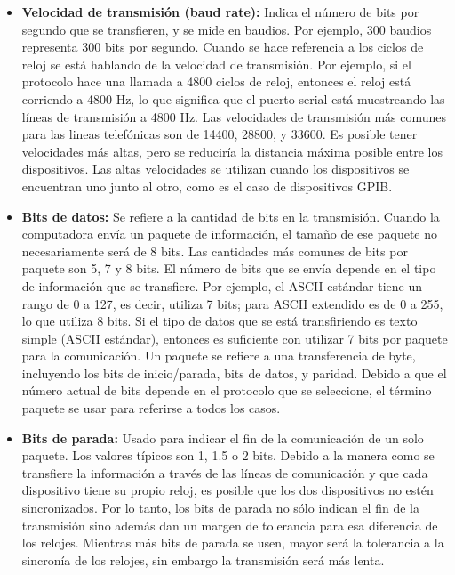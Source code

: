 \begin{itemize}
  \item \textbf{Velocidad de transmisión (baud rate):} Indica el número de bits por segundo que se transfieren, y se mide en baudios. Por ejemplo, 300 baudios representa 300 bits por segundo. Cuando se hace referencia a los ciclos de reloj se está hablando de la velocidad de transmisión. Por ejemplo, si el protocolo hace una llamada a 4800 ciclos de reloj, entonces el reloj está corriendo a 4800 Hz, lo que significa que el puerto serial está muestreando las líneas de transmisión a 4800 Hz. Las velocidades de transmisión más comunes para las lineas telefónicas son de 14400, 28800, y 33600. Es posible tener velocidades más altas, pero se reduciría la distancia máxima posible entre los dispositivos. Las altas velocidades se utilizan cuando los dispositivos se encuentran uno junto al otro, como es el caso de dispositivos GPIB.
  \item \textbf{Bits de datos:} Se refiere a la cantidad de bits en la transmisión. Cuando la computadora envía un paquete de información, el tamaño de ese paquete no necesariamente será de 8 bits. Las cantidades más comunes de bits por paquete son 5, 7 y 8 bits. El número de bits que se envía depende en el tipo de información que se transfiere. Por ejemplo, el ASCII estándar tiene un rango de 0 a 127, es decir, utiliza 7 bits; para ASCII extendido es de 0 a 255, lo que utiliza 8 bits. Si el tipo de datos que se está transfiriendo es texto simple (ASCII estándar), entonces es suficiente con utilizar 7 bits por paquete para la comunicación. Un paquete se refiere a una transferencia de byte, incluyendo los bits de inicio/parada, bits de datos, y paridad. Debido a que el número actual de bits depende en el protocolo que se seleccione, el término paquete se usar para referirse a todos los casos.
  \item \textbf{Bits de parada:} Usado para indicar el fin de la comunicación de un solo paquete. Los valores típicos son 1, 1.5 o 2 bits. Debido a la manera como se transfiere la información a través de las líneas de comunicación y que cada dispositivo tiene su propio reloj, es posible que los dos dispositivos no estén sincronizados. Por lo tanto, los bits de parada no sólo indican el fin de la transmisión sino además dan un margen de tolerancia para esa diferencia de los relojes. Mientras más bits de parada se usen, mayor será la tolerancia a la sincronía de los relojes, sin embargo la transmisión será más lenta.

\end{itemize}
